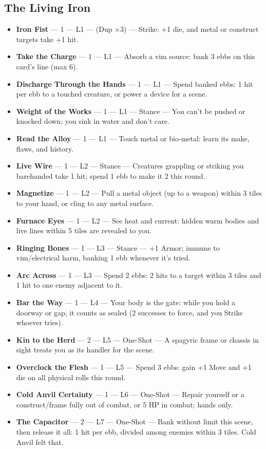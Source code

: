 \subsection{The Living Iron}
\begin{itemize}
    \item \textbf{Iron Fist} --- 1 --- L1 --- (Dup ×3) --- Strike: +1 die, and metal or construct targets take +1 hit.
    \item \textbf{Take the Charge} --- 1 --- L1 --- Absorb a vim source: bank 3 ebbs on this card's line (max 6).
    \item \textbf{Discharge Through the Hands} --- 1 --- L1 --- Spend banked ebbs: 1 hit per ebb to a touched creature, or power a device for a scene.
    \item \textbf{Weight of the Works} --- 1 --- L1 --- Stance --- You can't be pushed or knocked down; you sink in water and don't care.
    \item \textbf{Read the Alloy} --- 1 --- L1 --- Touch metal or bio-metal: learn its make, flaws, and history.
    \item \textbf{Live Wire} --- 1 --- L2 --- Stance --- Creatures grappling or striking you barehanded take 1 hit; spend 1 ebb to make it 2 this round.
    \item \textbf{Magnetize} --- 1 --- L2 --- Pull a metal object (up to a weapon) within 3 tiles to your hand, or cling to any metal surface.
    \item \textbf{Furnace Eyes} --- 1 --- L2 --- See heat and current: hidden warm bodies and live lines within 5 tiles are revealed to you.
    \item \textbf{Ringing Bones} --- 1 --- L3 --- Stance --- +1 Armor; immune to vim/electrical harm, banking 1 ebb whenever it's tried.
    \item \textbf{Arc Across} --- 1 --- L3 --- Spend 2 ebbs: 2 hits to a target within 3 tiles and 1 hit to one enemy adjacent to it.
    \item \textbf{Bar the Way} --- 1 --- L4 --- Your body is the gate: while you hold a doorway or gap, it counts as sealed (2 successes to force, and you Strike whoever tries).
    \item \textbf{Kin to the Herd} --- 2 --- L5 --- One-Shot --- A spagyric frame or chassis in sight treats you as its handler for the scene.
    \item \textbf{Overclock the Flesh} --- 1 --- L5 --- Spend 3 ebbs: gain +1 Move and +1 die on all physical rolls this round.
    \item \textbf{Cold Anvil Certainty} --- 1 --- L6 --- One-Shot --- Repair yourself or a construct/frame fully out of combat, or 5 HP in combat; hands only.
    \item \textbf{The Capacitor} --- 2 --- L7 --- One-Shot --- Bank without limit this scene, then release it all: 1 hit per ebb, divided among enemies within 3 tiles. Cold Anvil felt that.
\end{itemize}

